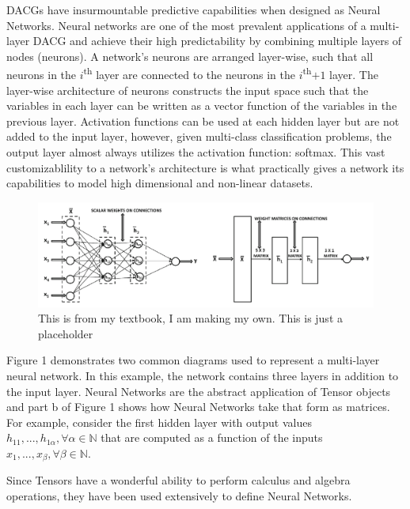 \documentclass{article}
\theoremstyle{definition}
\begin{document}
DACGs have insurmountable predictive capabilities when designed as Neural Networks.  Neural networks are one of the most prevalent applications of a multi-layer DACG and achieve their high predictability by combining multiple layers of nodes (neurons).  A network's neurons are arranged layer-wise, such that all neurons in the $i$\textsuperscript{th} layer are connected to the neurons in the $i$\textsuperscript{th}$+1$ layer. The layer-wise architecture of neurons constructs the input space such that the variables in each layer can be written as a vector function of the variables in the previous layer.  Activation functions can be used at each hidden layer but are not added to the input layer, however, given multi-class classification problems, the output layer almost always utilizes the activation function: softmax.  This vast customizablility to a network's architecture is what practically gives a network its capabilities to model high dimensional and non-linear datasets.  


\begin{figure}
\centering
\includegraphics[width=1\linewidth]{pics/nn_graphs.png}
\caption{\label{fig:nng}This is from my textbook, I am making my own. This is just a placeholder}
\end{figure}


Figure 1 demonstrates two common diagrams used to represent a multi-layer neural network.  In this
example, the network contains three layers in addition to the input layer.  Neural Networks are the abstract application of Tensor objects and part b of Figure 1 shows how Neural Networks take that form as matrices.  For example, consider the first hidden layer with output values $ h_{11}, ..., h_{1 \alpha}, \forall \alpha \in \mathbb{N} $ that are computed as a function of the inputs $x_1, ..., x_{\beta}, \forall \beta \in \mathbb{N}$.  



Since Tensors have a wonderful ability to perform calculus and algebra operations, they have been used extensively to define Neural Networks. 
\end{document}
